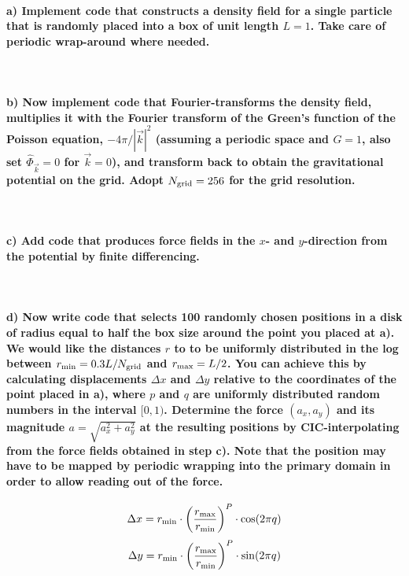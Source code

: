 \paragraph{a) Implement code that constructs a density field for a single 
    particle that is randomly placed into a box of unit length $L=1$. 
    Take care of periodic wrap-around where needed.
} \ \\


\paragraph{b) Now implement code that Fourier-transforms the density field, 
    multiplies it with the Fourier transform of the Green's function of the 
    Poisson equation, $-4\pi/|\vec k|^2$ (assuming a periodic space and 
    $G=1$, also set $\hat{\Phi}_{\vec k}=0$ for $\vec k=0$), and transform back 
    to obtain the gravitational potential on the grid. Adopt 
    $N_\textnormal{grid}=256$ for the grid resolution.
} \ \\


\paragraph{c) Add code that produces force fields in the $x$- and 
    $y$-direction from the potential by finite differencing.
} \ \\


\paragraph{d) Now write code that selects 100 randomly chosen positions in a 
    disk of radius equal to half the box size around the point you placed at 
    a). We would like the distances $r$ to to be uniformly distributed in the 
    log between $r_\textnormal{min}=0.3L/N_\textnormal{grid}$ and 
    $r_\textnormal{max}=L/2$. You can achieve this by calculating 
    displacements $\Delta x$ and $\Delta y$ relative to the coordinates of the 
    point placed in a), where $p$ and $q$ are uniformly distributed random 
    numbers in the interval $[0,1)$. Determine the force $(a_x,a_y)$ and its 
    magnitude $a=\sqrt{a_x^2+a_y^2}$ at the resulting positions by 
    CIC-interpolating from the force fields obtained in step c). Note that 
    the position may have to be mapped by periodic wrapping into the primary 
    domain in order to allow reading out of the force.
}
    \begin{equation}
        \Delta x=
        r_\textnormal{min}\cdot\bigg(
            \frac{r_\textnormal{max}}{r_\textnormal{min}}
        \bigg)^P\cdot\cos(2\pi q)
    \end{equation}
    \begin{equation}
        \Delta y=
        r_\textnormal{min}\cdot\bigg(
            \frac{r_\textnormal{max}}{r_\textnormal{min}}
        \bigg)^P\cdot\sin(2\pi q)
    \end{equation}


